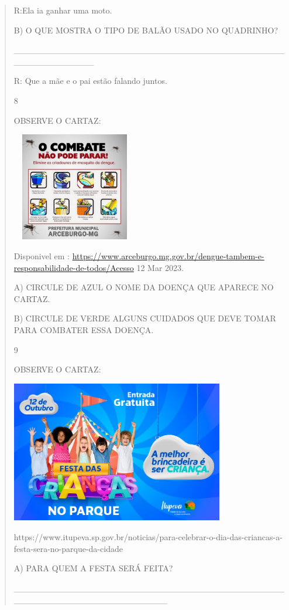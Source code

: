 \begin{verse}
{{{R:Ela ia ganhar uma moto.

B) O QUE MOSTRA O TIPO DE BALÃO USADO NO QUADRINHO?

\_\_\_\_\_\_\_\_\_\_\_\_\_\_\_\_\_\_\_\_\_\_\_\_\_\_\_\_\_\_\_\_\_\_\_\_\_\_\_\_\_\_\_\_\_\_\_\_\_\_\_\_\_\_\_\_\_

R: Que a mãe e o pai estão falando juntos.

\num{8}

OBSERVE O CARTAZ:

\includegraphics[width=2.15306in,height=1.86730in]{media/image134.jpeg}

Disponivel em :
\url{https://www.arceburgo.mg.gov.br/dengue-tambem-e-responsabilidade-de-todos/Acesso}
12 Mar 2023.

A) CIRCULE DE AZUL O NOME DA DOENÇA QUE APARECE NO CARTAZ.

B) CIRCULE DE VERDE ALGUNS CUIDADOS QUE DEVE TOMAR PARA COMBATER ESSA
DOENÇA.

\num{9}

OBSERVE O CARTAZ:

\includegraphics[width=3.66026in,height=2.43572in]{media/image135.jpeg}

https://www.itupeva.sp.gov.br/noticias/para-celebrar-o-dia-das-criancas-a-festa-sera-no-parque-da-cidade

A) PARA QUEM A FESTA SERÁ FEITA?

\_\_\_\_\_\_\_\_\_\_\_\_\_\_\_\_\_\_\_\_\_\_\_\_\_\_\_\_\_\_\_\_\_\_\_\_\_\_\_\_\_\_\_\_\_\_\_\_\_\_\_\_\_\_\_\_\_\_\_\_\_\_\_\_\_\_\_\_\_

}}}
\end{verse}
